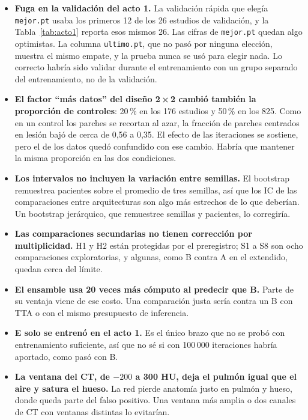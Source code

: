 \begin{itemize}
\item \textbf{Fuga en la validación del acto 1.} La validación rápida que elegía \texttt{mejor.pt} usaba los primeros 12 de los 26 estudios de validación, y la Tabla~\ref{tab:acto1} reporta esos mismos 26. Las cifras de \texttt{mejor.pt} quedan algo optimistas. La columna \texttt{ultimo.pt}, que no pasó por ninguna elección, muestra el mismo empate, y la prueba nunca se usó para elegir nada. Lo correcto habría sido validar durante el entrenamiento con un grupo separado del entrenamiento, no de la validación.
\item \textbf{El factor ``más datos'' del diseño 2\,×\,2 cambió también la proporción de controles}: 20\,\% en los 176 estudios y 50\,\% en los 825. Como en un control los parches se recortan al azar, la fracción de parches centrados en lesión bajó de cerca de 0,56 a 0,35. El efecto de las iteraciones se sostiene, pero el de los datos quedó confundido con ese cambio. Habría que mantener la misma proporción en las dos condiciones.
\item \textbf{Los intervalos no incluyen la variación entre semillas.} El bootstrap remuestrea pacientes sobre el promedio de tres semillas, así que los IC de las comparaciones entre arquitecturas son algo más estrechos de lo que deberían. Un bootstrap jerárquico, que remuestree semillas y pacientes, lo corregiría.
\item \textbf{Las comparaciones secundarias no tienen corrección por multiplicidad.} H1 y H2 están protegidas por el preregistro; S1 a S8 son ocho comparaciones exploratorias, y algunas, como B contra A en el extendido, quedan cerca del límite.
\item \textbf{El ensamble usa 20 veces más cómputo al predecir que B.} Parte de su ventaja viene de ese costo. Una comparación justa sería contra un B con TTA o con el mismo presupuesto de inferencia.
\item \textbf{E solo se entrenó en el acto 1.} Es el único brazo que no se probó con entrenamiento suficiente, así que no sé si con 100\,000 iteraciones habría aportado, como pasó con B.
\item \textbf{La ventana del CT, de $-200$ a 300 HU, deja el pulmón igual que el aire y satura el hueso.} La red pierde anatomía justo en pulmón y hueso, donde queda parte del falso positivo. Una ventana más amplia o dos canales de CT con ventanas distintas lo evitarían.
\end{itemize}

